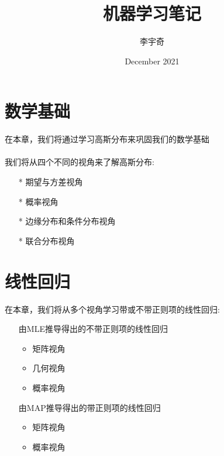 \documentclass{report}
\title{机器学习笔记}
\author{李宇奇}
\date{December 2021}
\begin{document}
\maketitle
\tableofcontents
\chapter{数学基础}
在本章，我们将通过学习高斯分布来巩固我们的数学基础\\\\
我们将从四个不同的视角来了解高斯分布:
\begin{itemize}
	\item[*] 期望与方差视角
	\item[*] 概率视角
	\item[*] 边缘分布和条件分布视角
	\item[*] 联合分布视角
\end{itemize}





\chapter{线性回归}
在本章，我们将从多个视角学习带或不带正则项的线性回归:
\begin{itemize}
	\item[] 由MLE推导得出的不带正则项的线性回归
	\begin{itemize}
	\item 矩阵视角
	\item 几何视角
	\item 概率视角
	\end{itemize}
	
	\item[] 由MAP推导得出的带正则项的线性回归
	\begin{itemize}
	\item 矩阵视角
	\item 概率视角
	\end{itemize}
\end{itemize}

\end{document}
